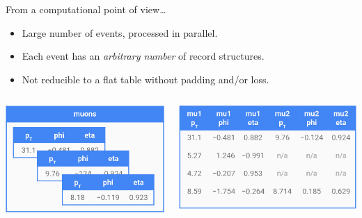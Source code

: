 \documentclass[aspectratio=169]{beamer}
\begin{document}
\begin{frame}{From a computational point of view\ldots}
\Large
\vspace{0.25 cm}
\begin{itemize}
\item Large number of events, processed in parallel.
\item Each event has an {\it arbitrary number} of record structures.
\item Not reducible to a flat table without padding and/or loss.
\end{itemize}

\vspace{0.25 cm}
\begin{columns}
\includegraphics[width=\linewidth]{muons-as-objects.png}

\includegraphics[width=\linewidth]{muons-as-a-table.png}
\end{columns}
\end{frame}
\end{document}
